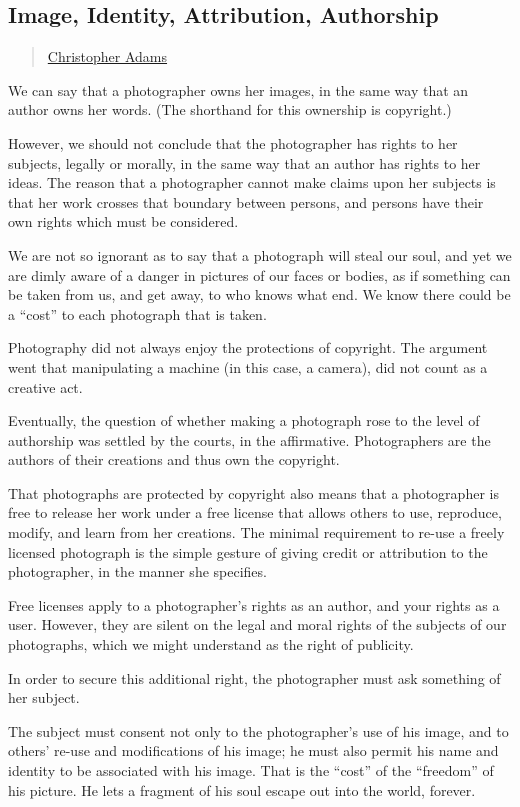 \subsection{Image, Identity, Attribution,
Authorship}\label{image-identity-attribution-authorship}

\begin{quote}
\hyperlink{christopher-adams}{Christopher
Adams}
\end{quote}

We can say that a photographer owns her images, in the same way that an
author owns her words. (The shorthand for this ownership is copyright.)

However, we should not conclude that the photographer has rights to her
subjects, legally or morally, in the same way that an author has rights
to her ideas. The reason that a photographer cannot make claims upon her
subjects is that her work crosses that boundary between persons, and
persons have their own rights which must be considered.

We are not so ignorant as to say that a photograph will steal our soul,
and yet we are dimly aware of a danger in pictures of our faces or
bodies, as if something can be taken from us, and get away, to who knows
what end. We know there could be a ``cost'' to each photograph that is
taken.

Photography did not always enjoy the protections of copyright. The
argument went that manipulating a machine (in this case, a camera), did
not count as a creative act.

Eventually, the question of whether making a photograph rose to the
level of authorship was settled by the courts, in the affirmative.
Photographers are the authors of their creations and thus own the
copyright.

That photographs are protected by copyright also means that a
photographer is free to release her work under a free license that
allows others to use, reproduce, modify, and learn from her creations.
The minimal requirement to re-use a freely licensed photograph is the
simple gesture of giving credit or attribution to the photographer, in
the manner she specifies.

Free licenses apply to a photographer's rights as an author, and your
rights as a user. However, they are silent on the legal and moral rights
of the subjects of our photographs, which we might understand as the
right of publicity.

In order to secure this additional right, the photographer must ask
something of her subject.

The subject must consent not only to the photographer's use of his
image, and to others' re-use and modifications of his image; he must
also permit his name and identity to be associated with his image. That
is the ``cost'' of the ``freedom'' of his picture. He lets a fragment of
his soul escape out into the world, forever.
